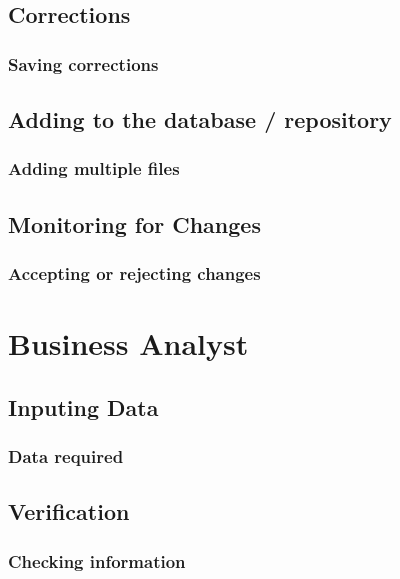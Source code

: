 \documentclass[a4paper,12pt]{article}
\begin{document}
   \subsection{Corrections}
      
      \subsubsection{Saving corrections}

    \subsection{Adding to the database / repository}
      
      \subsubsection{Adding multiple files}

    \subsection{Monitoring for Changes}

      \subsubsection{Accepting or rejecting changes}

\pagebreak
 
 \section{\bf Business Analyst}

  \subsection{Inputing Data}

     \subsubsection{Data required}
  
   \subsection{Verification}

      \subsubsection{Checking information}
      
\end{document}
